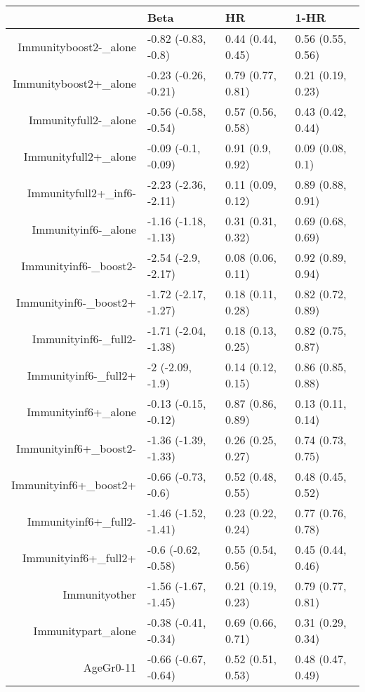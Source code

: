 \begin{table}[ht]
\centering
\begin{tabular}{rlll}
  \hline
 & Beta & HR & 1-HR \\ 
  \hline
Immunityboost2-\_alone & -0.82 (-0.83, -0.8) & 0.44 (0.44, 0.45) & 0.56 (0.55, 0.56) \\ 
  Immunityboost2+\_alone & -0.23 (-0.26, -0.21) & 0.79 (0.77, 0.81) & 0.21 (0.19, 0.23) \\ 
  Immunityfull2-\_alone & -0.56 (-0.58, -0.54) & 0.57 (0.56, 0.58) & 0.43 (0.42, 0.44) \\ 
  Immunityfull2+\_alone & -0.09 (-0.1, -0.09) & 0.91 (0.9, 0.92) & 0.09 (0.08, 0.1) \\ 
  Immunityfull2+\_inf6- & -2.23 (-2.36, -2.11) & 0.11 (0.09, 0.12) & 0.89 (0.88, 0.91) \\ 
  Immunityinf6-\_alone & -1.16 (-1.18, -1.13) & 0.31 (0.31, 0.32) & 0.69 (0.68, 0.69) \\ 
  Immunityinf6-\_boost2- & -2.54 (-2.9, -2.17) & 0.08 (0.06, 0.11) & 0.92 (0.89, 0.94) \\ 
  Immunityinf6-\_boost2+ & -1.72 (-2.17, -1.27) & 0.18 (0.11, 0.28) & 0.82 (0.72, 0.89) \\ 
  Immunityinf6-\_full2- & -1.71 (-2.04, -1.38) & 0.18 (0.13, 0.25) & 0.82 (0.75, 0.87) \\ 
  Immunityinf6-\_full2+ & -2 (-2.09, -1.9) & 0.14 (0.12, 0.15) & 0.86 (0.85, 0.88) \\ 
  Immunityinf6+\_alone & -0.13 (-0.15, -0.12) & 0.87 (0.86, 0.89) & 0.13 (0.11, 0.14) \\ 
  Immunityinf6+\_boost2- & -1.36 (-1.39, -1.33) & 0.26 (0.25, 0.27) & 0.74 (0.73, 0.75) \\ 
  Immunityinf6+\_boost2+ & -0.66 (-0.73, -0.6) & 0.52 (0.48, 0.55) & 0.48 (0.45, 0.52) \\ 
  Immunityinf6+\_full2- & -1.46 (-1.52, -1.41) & 0.23 (0.22, 0.24) & 0.77 (0.76, 0.78) \\ 
  Immunityinf6+\_full2+ & -0.6 (-0.62, -0.58) & 0.55 (0.54, 0.56) & 0.45 (0.44, 0.46) \\ 
  Immunityother & -1.56 (-1.67, -1.45) & 0.21 (0.19, 0.23) & 0.79 (0.77, 0.81) \\ 
  Immunitypart\_alone & -0.38 (-0.41, -0.34) & 0.69 (0.66, 0.71) & 0.31 (0.29, 0.34) \\ 
  AgeGr0-11 & -0.66 (-0.67, -0.64) & 0.52 (0.51, 0.53) & 0.48 (0.47, 0.49) \\ 

\end{tabular}
\end{table}
